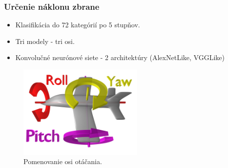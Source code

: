 \documentclass[10pt,xcolor=pdflatex]{beamer}
\begin{document}
\begin{frame}\frametitle{Určenie náklonu zbrane}
    \begin{itemize}
        \item Klasifikácia do 72 kategórií po 5 stupňov.
        \item Tri modely - tri osi.
        \vspace{0.2cm}
        \item Konvolučné neurónové siete - 2 architektúry (AlexNetLike, VGGLike)
    \end{itemize}

    \begin{figure}[H]
        \centering
        \includegraphics[width=0.55\textwidth]{img/airplane-axis}
        \caption{Pomenovanie osi otáčania.}
    \end{figure}

\end{frame}
\end{document}
